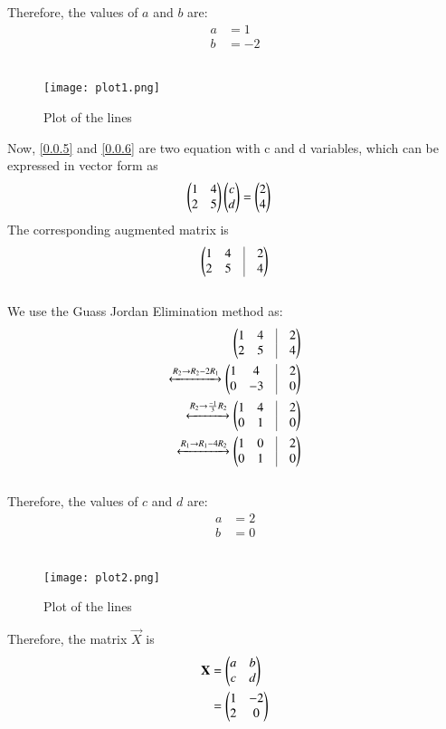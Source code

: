 \documentclass[journal,12pt,twocolumn]{IEEEtran}
\begin{document}
Therefore, the values of $a$ and $b$ are:
\begin{align}
	a &= 1 \\
	b & = -2
\end{align}\\
\begin{figure}[!h]
\centering
\texttt{[image: plot1.png]}
\caption{Plot of the lines}
\label{plt_1}
\end{figure}

Now, \eqref{0.0.5} and \eqref{0.0.6} are two equation with c and d variables, which can be expressed in vector form as 
\begin{align}
  \begin{pmatrix}1 & 4 \\ 2 & 5\end{pmatrix}\begin{pmatrix}c \\ d\end{pmatrix} &= \begin{pmatrix}2 \\ 4\end{pmatrix} 
\end{align}
The corresponding augmented matrix is
\begin{align}
    	\myvec{
		1 & 4 & \vrule & 2 \\
		2 & 5 & \vrule & 4 \\
	}
\end{align}\\
We use the Guass Jordan Elimination method as:
\begin{align}
	\myvec{
		1 & 4 & \vrule & 2 \\
		2 & 5 & \vrule & 4 \\
	}
	\\
	\xleftrightarrow[]{R_2 \rightarrow R_2 - 2R_1}
	\myvec{
		1 & 4 & \vrule & 2 \\
		0 & -3 & \vrule & 0 \\
	}
	\\
	\xleftrightarrow[]{R_2\rightarrow \frac{-1}{3}R_2}
	\myvec{
		1 & 4 & \vrule & 2 \\
		0 & 1 & \vrule & 0 \\
	}
	\\
	\xleftrightarrow[]{R_1 \rightarrow R_1 - 4R_2}
	\myvec{
		1 & 0 & \vrule & 2 \\
		0 & 1 & \vrule & 0 \\
	}
\end{align}\\
Therefore, the values of $c$ and $d$ are:
\begin{align}
	a &= 2 \\
	b & = 0
\end{align}\\
\begin{figure}[!h]
\centering
\texttt{[image: plot2.png]}
\caption{Plot of the lines}
\label{plt_2}
\end{figure}

Therefore, the matrix $\vec{X}$ is
\begin{align}
  \mathbf{X} &= \begin{pmatrix}a & b \\ c & d\end{pmatrix}\\
          &= \begin{pmatrix}1 & -2 \\ 2 & 0\end{pmatrix}
\end{align}
\end{document}
